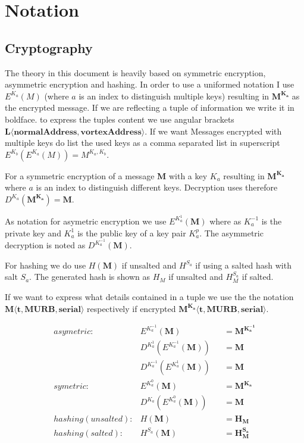 \section{Notation}
\subsection{Cryptography}
The theory in this document is heavily based on symmetric encryption, asymmetric encryption and hashing. In order to use a uniformed notation I use $E^{K_a}(M)$ (where $a$ is an index to distinguish multiple keys) resulting in $\mathbf{M^{K_a}}$ as the encrypted message. If we are reflecting a tuple of information we write it in boldface. to express the tuples content we use angular brackets $\mathbf{L\langle normalAddress,vortexAddress\rangle }$. If we want Messages encrypted with multiple keys do list the used keys as a comma separated list in superscript $E^{K_b}\left(E^{K_a}\left(M\right)\right)=M^{{K_{a}},{K_b}}$.

For a symmetric encryption of a message $\mathbf{M}$ with a key $K_a$ resulting in $\mathbf{M^{K_a}}$ where $a$ is an index to distinguish different keys. Decryption uses therefore $D^{K_a}(\mathbf{M^{K_a}})=\mathbf{M}$.

As notation for asymetric encryption we use $E^{K^{1}_a}(\mathbf{M})$ where as $K^{-1}_a$ is the private key and $K^{1}_a$ is the public key of a key pair $K^p_a$. The asymmetric decryption is noted as $D^{K^{-1}_a}(\mathbf{M})$.

For hashing we do use $H(\mathbf{M})$ if unsalted and $H^{S_a}$ if using a salted hash with salt $S_a$. The generated hash is shown as $H_M$ if unsalted and $H^{S_a}_M$ if salted.

If we want to express what details contained in a tuple we use the the notation $\mathbf{M\langle t,MURB,serial\rangle }$ respectively if encrypted $\mathbf{M^{K_{a}}\langle t,MURB,serial\rangle}$.

\begin{align*}
asymetric:         & E^{K^{-1}_a}\left(\mathbf{M}\right)                        	&& =\mathbf{M^{K^{-1}_a}}\\
                   & D^{K^{1}_a}\left(E^{K^{-1}_a}\left(\mathbf{M}\right)\right)	&& =\mathbf{M}\\
                   & D^{K^{-1}_a}\left(E^{K^{1}_a}\left(\mathbf{M}\right)\right)	&& =\mathbf{M}\\
symetric:          & E^{K^{0}_a}\left(\mathbf{M}\right)                             	&& =\mathbf{M^{K_a}}\\
                   & D^{K_a}\left(E^{K^{0}_a}\left(\mathbf{M}\right)\right)         	&& =\mathbf{M}\\
hashing (unsalted):& H\left(\mathbf{M}\right)                                   	&& =\mathbf{H_M}\\
hashing (salted):  & H^{S_a}\left(\mathbf{M}\right)                             	&& =\mathbf{H^{S_a}_M}
\end{align*}

